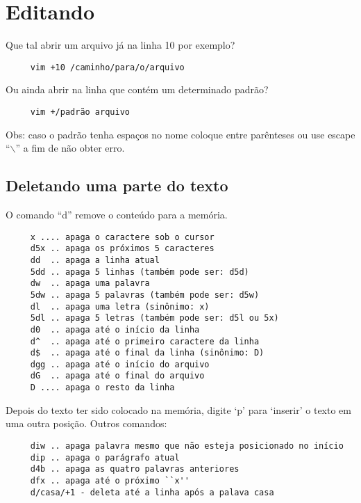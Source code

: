 \chapter{Editando}
\label{Editando}

Que tal abrir um arquivo já na linha 10 por exemplo?

\begin{verbatim}
     vim +10 /caminho/para/o/arquivo
\end{verbatim}

Ou ainda abrir na linha que contém um determinado padrão?

\begin{verbatim}
     vim +/padrão arquivo
\end{verbatim}

Obs: caso o padrão tenha espaços no nome coloque entre parênteses ou
use escape ``$\backslash$'' a fim de não obter erro.

\section{Deletando uma parte do texto}\label{Deletando uma parte do texto}

O comando ``d'' remove o conteúdo para a memória.

\begin{verbatim}
     x .... apaga o caractere sob o cursor
     d5x .. apaga os próximos 5 caracteres
     dd  .. apaga a linha atual
     5dd .. apaga 5 linhas (também pode ser: d5d)
     dw  .. apaga uma palavra
     5dw .. apaga 5 palavras (também pode ser: d5w)
     dl  .. apaga uma letra (sinônimo: x)
     5dl .. apaga 5 letras (também pode ser: d5l ou 5x)
     d0  .. apaga até o início da linha
     d^  .. apaga até o primeiro caractere da linha
     d$  .. apaga até o final da linha (sinônimo: D)
     dgg .. apaga até o início do arquivo
     dG  .. apaga até o final do arquivo
     D .... apaga o resto da linha
\end{verbatim}

Depois do texto ter sido colocado na memória, digite `p' para `inserir' o
texto em uma outra posição. Outros comandos:

\begin{verbatim}
     diw .. apaga palavra mesmo que não esteja posicionado no início
     dip .. apaga o parágrafo atual
     d4b .. apaga as quatro palavras anteriores
     dfx .. apaga até o próximo ``x''
     d/casa/+1 - deleta até a linha após a palava casa
\end{verbatim}

